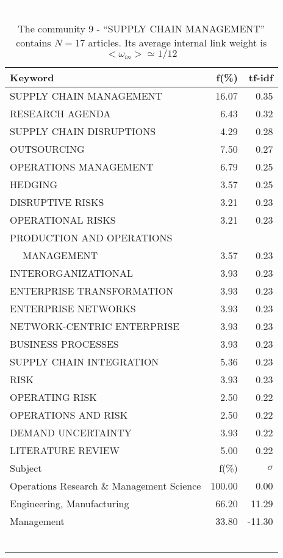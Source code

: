 \documentclass[a4paper,11pt]{report}
\begin{document}
\begin{landscape}
\begin{table}[!ht]
\caption{The community 9 - ``SUPPLY CHAIN MANAGEMENT'' contains $N = 17$ articles. Its average internal link weight is $<\omega_{in}> \simeq 1/12$ }
\textcolor{white}{aa}\\
{\scriptsize\begin{tabular}{|l r  r|}
\hline
Keyword & f(\%) & tf-idf \\
\hline
SUPPLY CHAIN MANAGEMENT & 16.07 & 0.35\\
RESEARCH AGENDA & 6.43 & 0.32\\
SUPPLY CHAIN DISRUPTIONS & 4.29 & 0.28\\
OUTSOURCING & 7.50 & 0.27\\
OPERATIONS MANAGEMENT & 6.79 & 0.25\\
HEDGING & 3.57 & 0.25\\
DISRUPTIVE RISKS & 3.21 & 0.23\\
OPERATIONAL RISKS & 3.21 & 0.23\\
PRODUCTION AND OPERATIONS &  &\\
$\quad$ MANAGEMENT & 3.57 & 0.23\\
INTERORGANIZATIONAL & 3.93 & 0.23\\
ENTERPRISE TRANSFORMATION & 3.93 & 0.23\\
ENTERPRISE NETWORKS & 3.93 & 0.23\\
NETWORK-CENTRIC ENTERPRISE & 3.93 & 0.23\\
BUSINESS PROCESSES & 3.93 & 0.23\\
SUPPLY CHAIN INTEGRATION & 5.36 & 0.23\\
RISK & 3.93 & 0.23\\
OPERATING RISK & 2.50 & 0.22\\
OPERATIONS AND RISK & 2.50 & 0.22\\
DEMAND UNCERTAINTY & 3.93 & 0.22\\
LITERATURE REVIEW & 5.00 & 0.22\\
\hline
\hline
Subject & f(\%) & $\sigma$\\
\hline
Operations Research \& Management Science & 100.00 & 0.00\\
Engineering, Manufacturing & 66.20 & 11.29\\
Management & 33.80 & -11.30\\
 &  & \\
 &  & \\
 &  & \\
 &  & \\
 &  & \\
 &  & \\

\end{tabular}}
\end{table}
\end{landscape}
\end{document}
